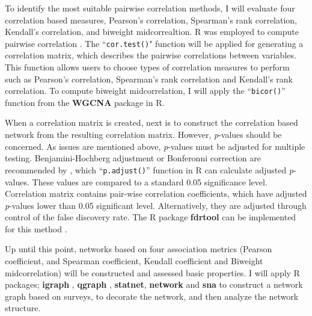 To identify the most suitable pairwise correlation methods, I will evaluate four correlation based measures, Pearson's correlation, Spearman's rank correlation, Kendall's correlation, and biweight midcorrealtion. R was employed to compute pairwise correlation . The ``\texttt{cor.test()}" function will be applied for generating a correlation matrix, which describes the pairwise correlations between variables. This function allows users to choose types of correlation measures to perform such as Pearson's correlation, Spearman's rank correlation and Kendall's rank correlation. To compute biweight midcorrelation, I will apply the ``\texttt{bicor()}'' function from the \textbf{WGCNA} package  in R. 

When a correlation matrix is created, next is to construct the correlation based network from the resulting correlation matrix. However, \textit{p}-values should be concerned. As issues are mentioned above, \textit{p}-values must be adjusted for multiple testing. Benjamini-Hochberg adjustment or Bonferonni correction are recommended by , which ``\texttt{p.adjust()}'' function in R can calculate adjusted \textit{p}-values. These values are compared to a standard 0.05 significance level. Correlation matrix contains pair-wise correlation coefficients, which have adjusted \textit{p}-values lower than 0.05 significant level. Alternatively, they are adjusted through control of the false discovery rate. The R package \textbf{fdrtool} can be implemented for this method .

Up until this point, networks based on four association metrics (Pearson coefficient, and Spearman coefficient, Kendall coefficient and Biweight midcorrelation) will be constructed and assessed basic properties. I will apply R packages; \textbf{igraph} , \textbf{qgraph} , \textbf{statnet}, \textbf{network}  and \textbf{sna} to construct a network graph based on surveys, to decorate the network, and then analyze the network structure.

